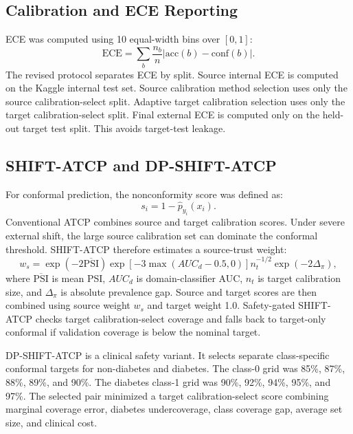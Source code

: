 \documentclass{ieeeaccess}
\begin{document}
\subsection{Calibration and ECE Reporting}
ECE was computed using 10 equal-width bins over $[0,1]$:
\begin{equation}
\mathrm{ECE}=\sum_b \frac{n_b}{n}\left|\mathrm{acc}(b)-\mathrm{conf}(b)\right|.
\end{equation}
The revised protocol separates ECE by split. Source internal ECE is computed on the Kaggle internal test set. Source calibration method selection uses only the source calibration-select split. Adaptive target calibration selection uses only the target calibration-select split. Final external ECE is computed only on the held-out target test split. This avoids target-test leakage.

\subsection{SHIFT-ATCP and DP-SHIFT-ATCP}
For conformal prediction, the nonconformity score was defined as:
\begin{equation}
s_i=1-\hat{p}_{y_i}(x_i).
\end{equation}
Conventional ATCP combines source and target calibration scores. Under severe external shift, the large source calibration set can dominate the conformal threshold. SHIFT-ATCP therefore estimates a source-trust weight:
\begin{equation}
w_s=\exp(-2\overline{\mathrm{PSI}})\exp[-3\max(AUC_d-0.5,0)]n_t^{-1/2}\exp(-2\Delta_\pi),
\end{equation}
where $\overline{\mathrm{PSI}}$ is mean PSI, $AUC_d$ is domain-classifier AUC, $n_t$ is target calibration size, and $\Delta_\pi$ is absolute prevalence gap. Source and target scores are then combined using source weight $w_s$ and target weight 1.0. Safety-gated SHIFT-ATCP checks target calibration-select coverage and falls back to target-only conformal if validation coverage is below the nominal target.

DP-SHIFT-ATCP is a clinical safety variant. It selects separate class-specific conformal targets for non-diabetes and diabetes. The class-0 grid was 85\%, 87\%, 88\%, 89\%, and 90\%. The diabetes class-1 grid was 90\%, 92\%, 94\%, 95\%, and 97\%. The selected pair minimized a target calibration-select score combining marginal coverage error, diabetes undercoverage, class coverage gap, average set size, and clinical cost.
\end{document}
